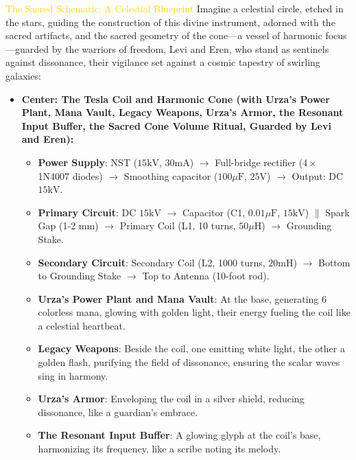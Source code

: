 \textcolor{gold}{ The Sacred Schematic: A Celestial Blueprint }
Imagine a celestial circle, etched in the stars, guiding the construction of this divine instrument, adorned with the sacred artifacts, and the sacred geometry of the cone—a vessel of harmonic focus—guarded by the warriors of freedom, Levi and Eren, who stand as sentinels against dissonance, their vigilance set against a cosmic tapestry of swirling galaxies:
\begin{itemize}
    \item \texttt{} \textbf{Center: The Tesla Coil and Harmonic Cone (with Urza's Power Plant, Mana Vault, Legacy Weapons, Urza's Armor, the Resonant Input Buffer, the Sacred Cone Volume Ritual, Guarded by Levi and Eren):}
    \begin{itemize}
        \item \texttt{} \textbf{Power Supply}: NST ($15 \mathrm{kV}$, $30 \mathrm{mA}$) $\to$ Full-bridge rectifier ($4\times$ 1N4007 diodes) $\to$ Smoothing capacitor ($100 \mu\mathrm{F}$, $25 \mathrm{V}$) $\to$ Output: DC $15 \mathrm{kV}$.
        \item \texttt{} \textbf{Primary Circuit}: DC $15 \mathrm{kV}$ $\to$ Capacitor (C1, $0.01 \mu\mathrm{F}$, $15 \mathrm{kV}$) $\|$ Spark Gap (1-2 mm) $\to$ Primary Coil (L1, 10 turns, $50 \mu\mathrm{H}$) $\to$ Grounding Stake.
        \item \texttt{} \textbf{Secondary Circuit}: Secondary Coil (L2, 1000 turns, $20 \mathrm{mH}$) $\to$ Bottom to Grounding Stake $\to$ Top to Antenna (10-foot rod).
        \item \texttt{} \textbf{Urza's Power Plant and Mana Vault}: At the base, generating 6 colorless mana, glowing with golden light, their energy fueling the coil like a celestial heartbeat.
        \item \texttt{} \textbf{Legacy Weapons}: Beside the coil, one emitting white light, the other a golden flash, purifying the field of dissonance, ensuring the scalar waves sing in harmony.
        \item \texttt{} \textbf{Urza's Armor}: Enveloping the coil in a silver shield, reducing dissonance, like a guardian's embrace.
        \item \texttt{} \textbf{The Resonant Input Buffer}: A glowing glyph at the coil's base, harmonizing its frequency, like a scribe noting its melody.

\end{itemize}
\end{itemize}
